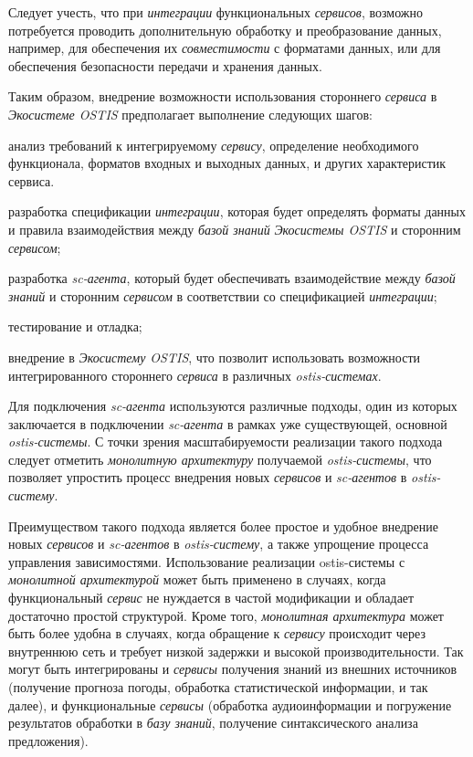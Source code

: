 Следует учесть, что при \textit{интеграции} функциональных \textit{сервисов}, возможно потребуется проводить дополнительную обработку и преобразование данных, например, для обеспечения их \textit{совместимости} с форматами данных, или для обеспечения безопасности передачи и хранения данных.

Таким образом, внедрение возможности использования стороннего \textit{сервиса} в \textit{Экосистеме OSTIS} предполагает выполнение следующих шагов:
\begin{textitemize}
    \item анализ требований к интегрируемому \textit{сервису}, определение необходимого функционала, форматов входных и выходных данных, и других характеристик сервиса.
    \item разработка спецификации \textit{интеграции}, которая будет определять форматы данных и правила взаимодействия между \textit{базой знаний} \textit{Экосистемы OSTIS} и сторонним \textit{сервисом};
    \item разработка \textit{sc-агента}, который будет обеспечивать взаимодействие между \textit{базой знаний} и сторонним \textit{сервисом} в соответствии со спецификацией \textit{интеграции};
    \item тестирование и отладка;
    \item внедрение в \textit{Экосистему OSTIS}, что позволит использовать возможности интегрированного стороннего \textit{сервиса} в различных \textit{ostis-системах}.
\end{textitemize}

Для подключения \textit{sc-агента} используются различные подходы, один из которых заключается в подключении \textit{sc-агента} в рамках уже существующей, основной \textit{ostis-системы}. С точки зрения масштабируемости реализации такого подхода следует отметить \textit{монолитную архитектуру} получаемой \textit{ostis-системы}, что позволяет упростить процесс внедрения новых \textit{сервисов} и \textit{sc-агентов} в \textit{ostis-систему}.

Преимуществом такого подхода является более простое и удобное внедрение новых \textit{сервисов} и \textit{sc-агентов} в \textit{ostis-систему}, а также упрощение процесса управления зависимостями. Использование реализации ostis-системы с \textit{монолитной архитектурой} может быть применено в случаях, когда функциональный \textit{сервис} не нуждается в частой модификации и обладает достаточно простой структурой. Кроме того, \textit{монолитная архитектура} может быть более удобна в случаях, когда обращение к \textit{сервису} происходит через внутреннюю сеть и требует низкой задержки и высокой производительности. Так могут быть интегрированы и \textit{сервисы} получения знаний из внешних источников (получение прогноза погоды, обработка статистической информации, и так далее), и функциональные \textit{сервисы} (обработка аудиоинформации и погружение результатов обработки в \textit{базу знаний}, получение синтаксического анализа предложения). 

